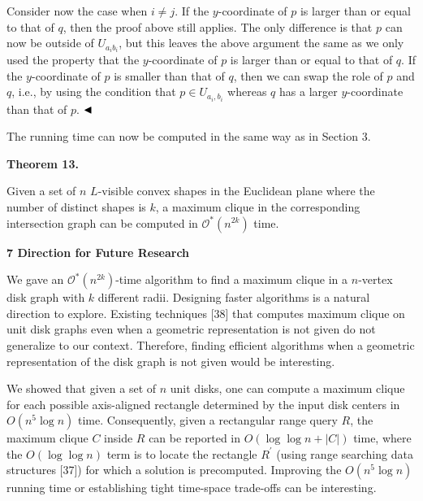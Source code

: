 \documentclass[10pt,a4paper]{amsart}
\begin{document}
\par
\par
Consider now the case when $i\not=j$. If the $y$-coordinate of $p$ is larger than or equal to that of $q$, then the proof above still applies. The only difference is that $p$ can now be outside of $U_{a_{i}b_{i}}$, but this leaves the above argument the same as we only used the property that the $y$-coordinate of $p$ is larger than or equal to that of $q$. If the $y$-coordinate of $p$ is smaller than that of $q$, then we can swap the role of $p$ and $q$, i.e., by using the condition that $p\in U_{a_{i},b_{i}}$ whereas $q$ has a larger $y$-coordinate than that of $p$. $\hfill\blacktriangleleft$
\par
\par
The running time can now be computed in the same way as in Section 3.
\par
\par
\par\medskip\noindent\textbf{Theorem 13.}\par
Given a set of $n$ $L$-visible convex shapes in the Euclidean plane where the number of distinct shapes is $k$, a maximum clique in the corresponding intersection graph can be computed in $\mathcal{O}^{*}(n^{2k})$ time.
\par
\par
\par
\par
\par
\par\medskip\noindent\textbf{7 Direction for Future Research}\par
We gave an $\mathcal{O}^{*}(n^{2k})$-time algorithm to find a maximum clique in a $n$-vertex disk graph with $k$ different radii. Designing faster algorithms is a natural direction to explore. Existing techniques [38] that computes maximum clique on unit disk graphs even when a geometric representation is not given do not generalize to our context. Therefore, finding efficient algorithms when a geometric representation of the disk graph is not given would be interesting.
\par
\par
We showed that given a set of $n$ unit disks, one can compute a maximum clique for each possible axis-aligned rectangle determined by the input disk centers in $O(n^{5}\log n)$ time. Consequently, given a rectangular range query $R$, the maximum clique $C$ inside $R$ can be reported in $O(\log\log n+|C|)$ time, where the $O(\log\log n)$ term is to locate the rectangle $R^{\prime}$ (using range searching data structures [37]) for which a solution is precomputed. Improving the $O(n^{5}\log n)$ running time or establishing tight time-space trade-offs can be interesting.
\end{document}
